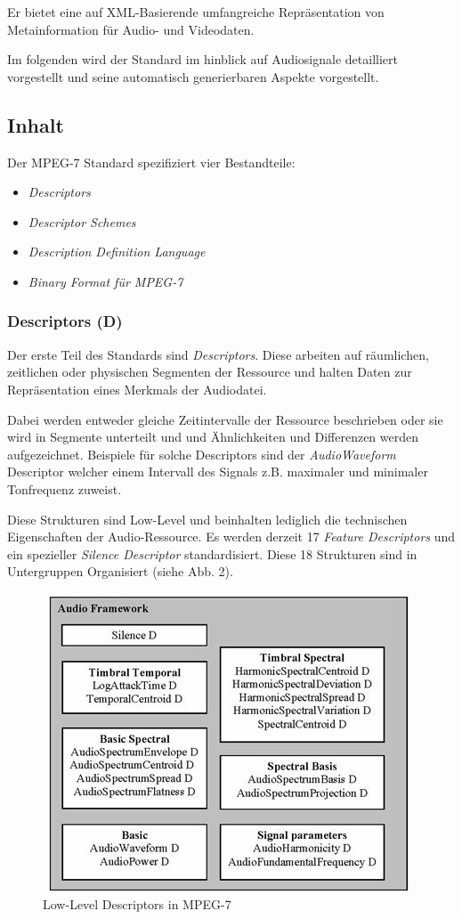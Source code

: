 	Er bietet eine auf XML-Basierende umfangreiche Repräsentation von Metainformation für Audio- und Videodaten.
	
	Im folgenden wird der Standard im hinblick auf Audiosignale detailliert vorgestellt und seine automatisch generierbaren Aspekte vorgestellt.
	
	\subsection{Inhalt}
	
	Der MPEG-7 Standard spezifiziert vier Bestandteile:
	\begin{itemize}
		\item \emph{Descriptors}
		\item \emph{Descriptor Schemes}
		\item \emph{Description Definition Language}
		\item \emph{Binary Format für MPEG-7}
	\end{itemize}
	
	\subsubsection {Descriptors (D)}
Der erste Teil des Standards sind \emph{Descriptors}. Diese arbeiten auf räumlichen, zeitlichen oder physischen Segmenten der Ressource und  halten Daten zur Repräsentation eines Merkmals der Audiodatei.

	Dabei werden entweder gleiche Zeitintervalle der Ressource beschrieben oder sie wird in Segmente unterteilt und und Ähnlichkeiten und Differenzen werden aufgezeichnet. Beispiele für solche Descriptors sind der \emph{AudioWaveform} Descriptor welcher einem Intervall des Signals z.B. maximaler und minimaler Tonfrequenz zuweist.

	Diese Strukturen sind Low-Level und beinhalten lediglich die technischen Eigenschaften der Audio-Ressource. Es werden derzeit 17 \emph{Feature Descriptors} und ein spezieller \emph{Silence Descriptor} standardisiert. Diese 18 Strukturen sind in Untergruppen Organisiert (siehe Abb. 2).

	\begin{figure}[h]
		\includegraphics [scale=0.65]{image061.jpg}
		\caption {Low-Level Descriptors in MPEG-7}
	\end{figure}

